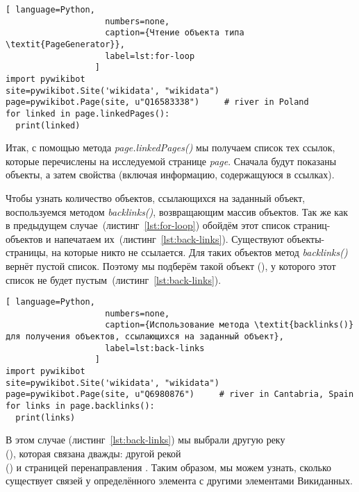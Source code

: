 \begin{lstlisting}[ language=Python,
                    numbers=none,
                    caption={Чтение объекта типа \textit{PageGenerator}},
                    label=lst:for-loop
                  ]
import pywikibot
site=pywikibot.Site('wikidata', "wikidata")
page=pywikibot.Page(site, u"Q16583338")     # river in Poland
for linked in page.linkedPages():
  print(linked)
\end{lstlisting}

Итак, с помощью метода \textit{page.linkedPages()} мы получаем список тех ссылок, которые перечислены на исследуемой странице \textit{page}. Сначала будут показаны объекты, а затем свойства (включая информацию, содержащуюся в ссылках).

Чтобы узнать количество объектов, ссылающихся на заданный объект, воспользуемся методом \textit{backlinks()}, возвращающим массив объектов. Так же как в предыдущем случае~(листинг~\ref{lst:for-loop}) обойдём этот список страниц-объектов и напечатаем их~(листинг~\ref{lst:back-links}). Существуют объекты-страницы, на которые никто не ссылается. Для таких объектов метод \textit{backlinks()} вернёт пустой список. Поэтому мы подберём такой объект (), у которого этот список не будет пустым~(листинг~\ref{lst:back-links}).

\begin{lstlisting}[ language=Python,
                    numbers=none,
                    caption={Использование метода \textit{backlinks()} для получения объектов, ссылающихся на заданный объект},
                    label=lst:back-links
                  ]
import pywikibot
site=pywikibot.Site('wikidata', "wikidata")
page=pywikibot.Page(site, u"Q6980876")     # river in Cantabria, Spain
for links in page.backlinks():
  print(links)
\end{lstlisting}

В этом случае (листинг~\ref{lst:back-links}) мы выбрали другую реку \\(), которая связана дважды: другой рекой \\() и страницей перенаправления . Таким образом, мы можем узнать, сколько существует связей у определённого элемента с другими элементами Викиданных.


